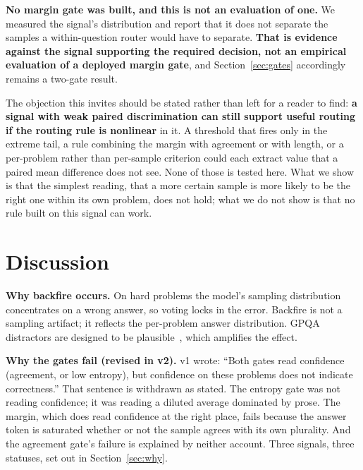 \documentclass{article}
\begin{document}
\textbf{No margin gate was built, and this is not an evaluation of one.} We
measured the signal's distribution and report that it does not separate the
samples a within-question router would have to separate. \textbf{That is
evidence against the signal supporting the required decision, not an empirical
evaluation of a deployed margin gate}, and Section~\ref{sec:gates} accordingly
remains a two-gate result.

The objection this invites should be stated rather than left for a reader to
find: \textbf{a signal with weak paired discrimination can still support useful
routing if the routing rule is nonlinear} in it. A threshold that fires only in
the extreme tail, a rule combining the margin with agreement or with length, or
a per-problem rather than per-sample criterion could each extract value that a
paired mean difference does not see. None of those is tested here. What we
show is that the simplest reading, that a more certain sample is more likely to
be the right one within its own problem, does not hold; what we do not show is
that no rule built on this signal can work.

\section{Discussion}
\label{sec:discussion}

\textbf{Why backfire occurs.} On hard problems the model's sampling
distribution concentrates on a wrong answer, so voting locks in the error.
Backfire is not a sampling artifact; it reflects the per-problem answer
distribution. GPQA distractors are designed to be
plausible~\citep{rein2023gpqa}, which amplifies the effect.

\textbf{Why the gates fail (revised in v2).} v1 wrote: ``Both gates read
confidence (agreement, or low entropy), but confidence on these problems does
not indicate correctness.'' That sentence is withdrawn as stated. The entropy
gate was not reading confidence; it was reading a diluted average dominated by
prose. The margin, which does read confidence at the right place, fails because
the answer token is saturated whether or not the sample agrees with its own
plurality. And the agreement gate's failure is explained by neither account.
Three signals, three statuses, set out in Section~\ref{sec:why}.
\end{document}
